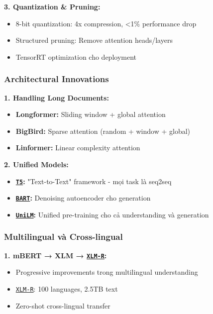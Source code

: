 \textbf{3.
Quantization \& Pruning:}
\begin{itemize}
    \item 8-bit quantization: 4x compression, <1\% performance drop
    \item Structured pruning: Remove attention heads/layers
    \item TensorRT optimization cho deployment
\end{itemize}

\subsubsection{Architectural Innovations}

\textbf{1.
Handling Long Documents:}
\begin{itemize}
    \item \textbf{Longformer:} Sliding window + global attention
    \item \textbf{BigBird:} Sparse attention (random + window + global)
    \item \textbf{Linformer:} Linear complexity attention
\end{itemize}

\textbf{2.
Unified Models:}
\begin{itemize}
    \item \textbf{\hyperref[acro:t5]{\texttt{T5}}:} "Text-to-Text" framework - mọi task là seq2seq
    \item \textbf{\hyperref[acro:bart]{\texttt{BART}}:} Denoising autoencoder cho generation
    \item \textbf{\hyperref[acro:unilm]{\texttt{UniLM}}:} Unified pre-training cho cả understanding và generation
\end{itemize}

\subsubsection{Multilingual và Cross-lingual}

\textbf{1.
mBERT → XLM → \hyperref[acro:xlm-r]{\texttt{XLM-R}}:}
\begin{itemize}
    \item Progressive improvements trong multilingual understanding
    \item \hyperref[acro:xlm-r]{\texttt{XLM-R}}: 100 languages, 2.5TB text
    \item Zero-shot cross-lingual transfer
\end{itemize}

